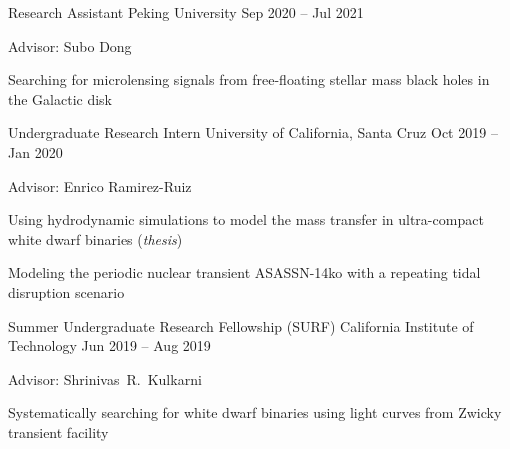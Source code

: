 


\begin{cventries}

    
    \cvsimpentry
    {Research Assistant} %
    {Peking University} %
    {Sep 2020 -- Jul 2021} %
    {\begin{cvitems}
        \item Advisor: Subo Dong
        \item Searching for microlensing signals from free-floating stellar mass black holes in the Galactic disk
    \end{cvitems}}
    
    \cvsimpentry
    {Undergraduate Research Intern} %
    {University of California, Santa Cruz} %
    {Oct 2019 -- Jan 2020} %
    {\begin{cvitems}
        \item Advisor: Enrico Ramirez-Ruiz
        \item Using hydrodynamic simulations to model the mass transfer in ultra-compact white dwarf binaries (\textit{thesis})
        \item Modeling the periodic nuclear transient ASASSN-14ko with a repeating tidal disruption scenario\dagger
    \end{cvitems}}

    
    \cvsimpentry
    {Summer Undergraduate Research Fellowship (SURF)} %
    {California Institute of Technology} %
    {Jun 2019 -- Aug 2019} %
    {\begin{cvitems}
        \item Advisor: Shrinivas~R.~Kulkarni
        \item Systematically searching for white dwarf binaries using light curves from Zwicky transient facility
    \end{cvitems}}


\end{cventries}
